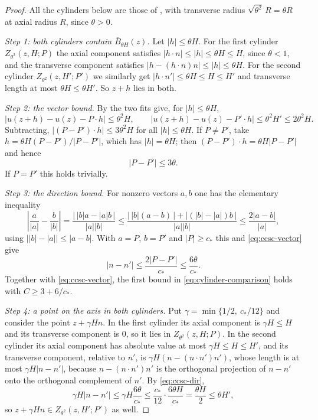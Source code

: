 \begin{proof}
All the cylinders below are those of , with transverse
radius $\sqrt{\theta^2}\,R=\theta R$ at axial radius $R$, since $\theta>0$.

\emph{Step 1: both cylinders contain $\overline B_{\theta H}(z)$.}
Let $|h|\le\theta H$. For the first cylinder $Z_{\theta^2}(z,H;P)$ the axial
component satisfies $|h\cdot n|\le|h|\le\theta H\le H$, since $\theta<1$, and
the transverse component satisfies $|h-(h\cdot n)n|\le|h|\le\theta H$. For the
second cylinder $Z_{\theta^2}(z,H';P')$ we similarly get
$|h\cdot n'|\le\theta H\le H\le H'$ and transverse length at most
$\theta H\le\theta H'$. So $z+h$ lies in both.

\emph{Step 2: the vector bound.}
By  the two fits give, for $|h|\le\theta H$,
\[
  |u(z+h)-u(z)-P\cdot h|\le\theta^2H,\qquad
  |u(z+h)-u(z)-P'\cdot h|\le\theta^2H'\le2\theta^2H .
\]
Subtracting, $|(P-P')\cdot h|\le3\theta^2H$ for all $|h|\le\theta H$. If
$P\ne P'$, take $h=\theta H(P-P')/|P-P'|$, which has $|h|=\theta H$; then
$(P-P')\cdot h=\theta H|P-P'|$ and hence
\begin{equation}\label{eq:ccsc-vector}
  |P-P'|\le3\theta .
\end{equation}
If $P=P'$ this holds trivially.

\emph{Step 3: the direction bound.}
For nonzero vectors $a,b$ one has the elementary inequality
\[
  \left|\frac a{|a|}-\frac b{|b|}\right|
   =\frac{\bigl|\,|b|a-|a|b\,\bigr|}{|a||b|}
   \le\frac{\bigl|\,|b|(a-b)\,\bigr|+\bigl|(|b|-|a|)b\,\bigr|}{|a||b|}
   \le\frac{2|a-b|}{|a|},
\]
using $\bigl||b|-|a|\bigr|\le|a-b|$. With $a=P$, $b=P'$ and $|P|\ge c_*$ this
and \eqref{eq:ccsc-vector} give
\begin{equation}\label{eq:ccsc-dir}
  |n-n'|\le\frac{2|P-P'|}{c_*}\le\frac{6\theta}{c_*}.
\end{equation}
Together with \eqref{eq:ccsc-vector}, the first bound in
\eqref{eq:cylinder-comparison} holds with $C\ge3+6/c_*$.

\emph{Step 4: a point on the axis in both cylinders.}
Put $\gamma=\min\{1/2,\ c_*/12\}$ and consider the point $z+\gamma Hn$. In the
first cylinder its axial component is $\gamma H\le H$ and its transverse
component is $0$, so it lies in $Z_{\theta^2}(z,H;P)$. In the second cylinder
its axial component has absolute value at most $\gamma H\le H\le H'$, and its
transverse component, relative to $n'$, is
$\gamma H(n-(n\cdot n')n')$, whose length is at most
$\gamma H|n-n'|$, because $n-(n\cdot n')n'$ is the orthogonal projection of
$n-n'$ onto the orthogonal complement of $n'$. By \eqref{eq:ccsc-dir},
\[
  \gamma H|n-n'|\le\gamma H\frac{6\theta}{c_*}
   \le\frac{c_*}{12}\cdot\frac{6\theta H}{c_*}=\frac{\theta H}2\le\theta H' ,
\]
so $z+\gamma Hn\in Z_{\theta^2}(z,H';P')$ as well.


\end{proof}
